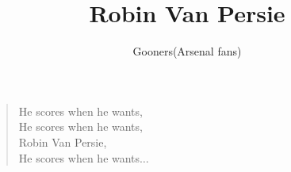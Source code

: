 \documentclass[a4paper,12pt]{article}
\title{Robin Van Persie}
\author{Gooners(Arsenal fans)}
\date{}
\begin{document}
	
	\maketitle
	
	\begin{verse}
		
		He scores when he wants, \\
		He scores when he wants, \\
		Robin Van Persie, \\
		He scores when he wants$\ldots$
		
	\end{verse}
	
\end{document}
